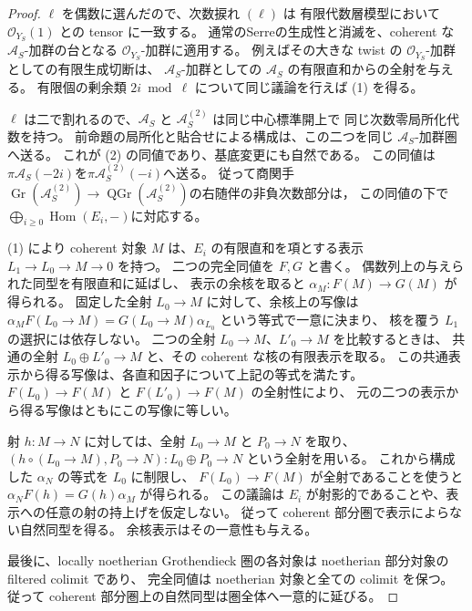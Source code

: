 \begin{proof}
$\ell$ を偶数に選んだので、次数捩れ $(\ell)$ は
有限代数層模型において $\mathcal O_{Y_S}(1)$ との tensor に一致する。
通常のSerreの生成性と消滅\cite[Lemma~30.14.2]{StacksProj}を、coherent な $\mathscr A_S$-加群の台となる
$\mathcal O_{Y_S}$-加群に適用する。
例えばその大きな twist の $\mathcal O_{Y_S}$-加群としての有限生成切断は、
$\mathscr A_S$-加群としての $\mathscr A_S$ の有限直和からの全射を与える。
有限個の剰余類 $2i\bmod\ell$ について同じ議論を行えば (1) を得る。

$\ell$ は二で割れるので、$\mathcal A_S$ と $\mathcal A_S^{(2)}$ は同じ中心標準開上で
同じ次数零局所化代数を持つ。
前命題の局所化と貼合せによる構成は、この二つを同じ $\mathscr A_S$-加群圏へ送る。
これが (2) の同値であり、基底変更にも自然である。
この同値は$\pi\mathcal A_S(-2i)$を$\pi\mathcal A_S^{(2)}(-i)$へ送る。
従って商関手$\operatorname{Gr}(\mathcal A_S^{(2)})\to
\operatorname{QGr}(\mathcal A_S^{(2)})$の右随伴の非負次数部分は，
この同値の下で$\bigoplus_{i\ge0}\operatorname{Hom}(E_i,-)$に対応する。

(1) により coherent 対象 $M$ は、$E_i$ の有限直和を項とする表示
$L_1\to L_0\to M\to0$ を持つ。
二つの完全同値を $F,G$ と書く。
偶数列上の与えられた同型を有限直和に延ばし、
表示の余核を取ると $\alpha_M:F(M)\to G(M)$ が得られる。
固定した全射 $L_0\to M$ に対して、余核上の写像は
$\alpha_M F(L_0\to M)=G(L_0\to M)\alpha_{L_0}$ という等式で一意に決まり、
核を覆う $L_1$ の選択には依存しない。
二つの全射 $L_0\to M$、$L'_0\to M$ を比較するときは、
共通の全射 $L_0\oplus L'_0\to M$ と、その coherent な核の有限表示を取る。
この共通表示から得る写像は、各直和因子について上記の等式を満たす。
$F(L_0)\to F(M)$ と $F(L'_0)\to F(M)$ の全射性により、
元の二つの表示から得る写像はともにこの写像に等しい。

射 $h:M\to N$ に対しては、全射 $L_0\to M$ と $P_0\to N$ を取り、
$(h\circ(L_0\to M),P_0\to N):L_0\oplus P_0\to N$ という全射を用いる。
これから構成した $\alpha_N$ の等式を $L_0$ に制限し、
$F(L_0)\to F(M)$ が全射であることを使うと
$\alpha_NF(h)=G(h)\alpha_M$ が得られる。
この議論は $E_i$ が射影的であることや、表示への任意の射の持上げを仮定しない。
従って coherent 部分圏で表示によらない自然同型を得る。
余核表示はその一意性も与える。

最後に、locally noetherian Grothendieck 圏の各対象は
noetherian 部分対象の filtered colimit であり、
完全同値は noetherian 対象と全ての colimit を保つ。
従って coherent 部分圏上の自然同型は圏全体へ一意的に延びる。
\end{proof}

